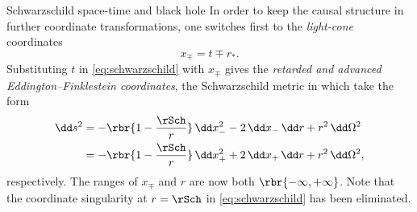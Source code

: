 \begin{nameddef}{Schwarzschild space-time and black hole}
In order to keep the causal structure in further coordinate transformations,
one switches first to the \emph{light-cone} coordinates
\begin{equation}
x_\mp = t\mp r_*.
\label{eq:trsf-tlto}
\end{equation}
Substituting $t$ in \cref{eq:schwarzschild} with $x_\mp$ gives
the \emph{retarded and advanced Eddington--Finklestein coordinates}, the 
Schwarzschild metric in which take the form
\begin{align}
\dd s^2
&= -\rbr{1-\frac{\rSch}{r}}\,\dd x_-^2 - 2\,\dd x_-\,\dd r + r^2\,\dd\Omega^2
\label{eq:retarded-efc} \\
&= -\rbr{1-\frac{\rSch}{r}}\,\dd x_+^2 + 2\,\dd x_+\,\dd r + r^2\,\dd\Omega^2,
\label{eq:advanced-efc}
\end{align}
respectively. The ranges of $x_\mp$ and $r$ are now both $\rbr{-\infty, 
+\infty}$. Note that the coordinate singularity at $r=\rSch$ in 
\cref{eq:schwarzschild} has been eliminated.


\end{nameddef}

